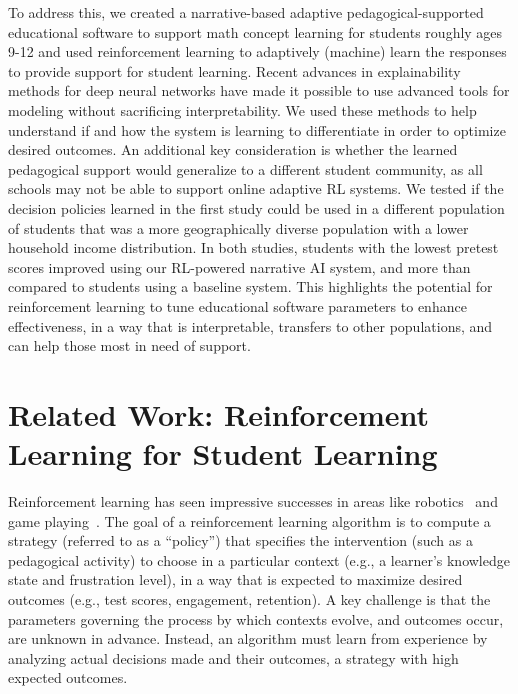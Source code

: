 \documentclass[sn-mathphys,Numbered]{sn-jnl}%
\theoremstyle{thmstyleone}%
\theoremstyle{thmstyletwo}%
\theoremstyle{thmstylethree}%
\begin{document}
To address this, we created a narrative-based adaptive pedagogical-supported educational software to support math concept learning for students roughly ages 9-12 and used reinforcement learning to adaptively (machine) learn the responses to provide support for student learning. Recent advances in explainability methods for deep neural networks have made it possible to use advanced tools for modeling without sacrificing interpretability.  We used these methods to help understand if and how the system is learning to differentiate in order to optimize desired outcomes. An additional key consideration is whether the learned pedagogical support would generalize to a different student community, as all schools may not be able to support online adaptive RL systems. We tested if the decision policies learned in the first study could be used in a different population of students that was a  more geographically diverse population with a lower household income distribution. In both studies, students with the lowest pretest scores improved using our RL-powered narrative AI system, and more than compared to students using a baseline system. This highlights the potential for reinforcement learning  to tune educational software parameters to enhance effectiveness, in a way that is interpretable, transfers to other populations, and can help those most in need of support. 

\section{Related Work: Reinforcement Learning for Student Learning}

Reinforcement learning has seen impressive successes in areas like robotics~\cite{levine2016end} and game playing~\cite{silver2018general}. The goal of a reinforcement learning algorithm is to compute a strategy (referred to as a “policy”) that specifies the intervention (such as a pedagogical activity) to choose in a particular context (e.g., a learner’s knowledge state and frustration level), in a way that is expected to maximize desired outcomes (e.g., test scores, engagement, retention). A key challenge is that the  parameters governing the process by which contexts evolve, and outcomes occur, are unknown in advance. Instead, an algorithm must learn from experience by analyzing actual decisions made and their outcomes, a strategy with high expected outcomes.
\end{document}
